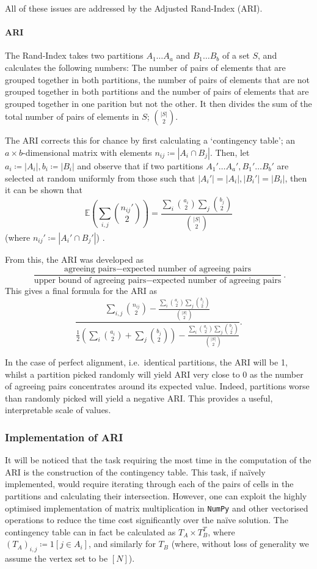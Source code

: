 All of these issues are addressed by the Adjusted Rand-Index (ARI).

\paragraph{ARI} The Rand-Index takes two partitions $A_1 \hdots A_a$ and $B_1 \hdots B_b$ of a set $S$, and 
calculates the following numbers: The number of pairs of elements that are grouped together in 
both partitions, the number of pairs of elements that are not grouped together in both partitions 
and the number of pairs of elements that are grouped together in one parition but not the other.
It then divides the sum of the total 
number of pairs of elements in $S$; $\binom{|S|}{2}$. 

The ARI corrects this for chance by first calculating a `contingency table'; an $a\times b$-dimensional matrix with elements $n_{ij}\coloneqq|A_i\cap B_j|$.
Then, let $a_i \coloneqq |A_i|, b_i \coloneqq |B_i|$ and observe that if two partitions $A_1'\hdots
A_a', B_1'\hdots B_b'$ are selected at random uniformly from those such that $|A_i'|=|A_i|, |B_i'|
= |B_i|$, then it can be shown %
that 
$$
\mathbb E\left(\sum_{i,j}\binom {n_{ij}'}{2}\right) = 
\frac{\sum_i \binom{a_i}{2} \sum_j \binom{b_j}{2}}{\binom{|S|}{2}}
$$
(where $n_{ij}' \coloneqq |A_i' \cap B_j'|$) \cite{hubert}.

From this, the ARI was developed as 
$$
	\frac{\text{agreeing pairs} - \text{expected number of agreeing pairs}}{\text{upper bound
	of agreeing pairs} - \text{expected number of agreeing pairs}}.
$$
This gives a final formula for the ARI as
$$
	\frac{\sum_{i,j} \binom{n_{ij}}2 -\frac{\sum_i\binom{a_i}2\sum_j\binom{b_j}2}{\binom{|S|}2}}
	{\frac12\left(\sum_i{\binom{a_i}2} + \sum_j\binom{b_j}2\right) - \frac{\sum_i\binom{a_i}2\sum_j\binom{b_j}2}{\binom{|S|}2}}.
$$

In the case of perfect alignment, i.e.\ identical partitions, the ARI will be 1, whilst a partition
picked randomly will yield ARI very close to 0 as the number of agreeing pairs concentrates around 
its expected value. Indeed, partitions worse than randomly picked will yield a negative ARI. This 
provides a useful, interpretable scale of values.

\subsubsection{Implementation of ARI}
It will be noticed that the task requiring the most time in the computation of the ARI is the 
construction of the contingency table. This task, if na\"ively implemented, would require 
iterating through each of the pairs of cells in the partitions and calculating their intersection. 
However, one can exploit the highly optimised implementation of matrix multiplication in \texttt
{NumPy} and other vectorised operations to reduce the time cost significantly over the na\"ive 
solution. The contingency table can in fact be calculated as $T_A \times T_B^T$, where $(T_A)_{i,j}
\coloneqq 1[j \in A_i]$, and similarly for $T_B$ (where, without loss of generality we assume the 
vertex set to be $[N]$). 

